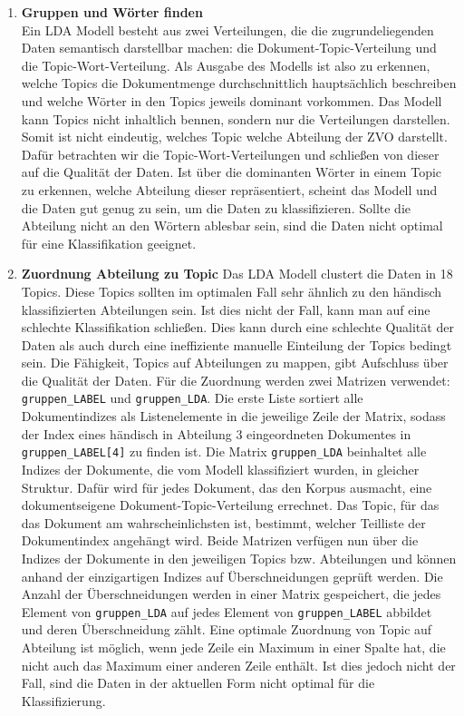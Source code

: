 \documentclass[german,version-2020-11]{uzl-thesis}
\begin{document}
\begin{enumerate}
\item \textbf{Gruppen und Wörter finden}\\
Ein LDA Modell besteht aus zwei Verteilungen, die die zugrundeliegenden Daten semantisch darstellbar machen: die Dokument-Topic-Verteilung und die Topic-Wort-Verteilung. Als Ausgabe des Modells ist also zu erkennen, welche Topics die Dokumentmenge durchschnittlich hauptsächlich beschreiben und welche Wörter in den Topics jeweils dominant vorkommen. Das Modell kann Topics nicht inhaltlich bennen, sondern nur die Verteilungen darstellen. Somit ist nicht eindeutig, welches Topic welche Abteilung der ZVO darstellt. Dafür betrachten wir die Topic-Wort-Verteilungen und schließen von dieser auf die Qualität der Daten. Ist über die dominanten Wörter in einem Topic zu erkennen, welche Abteilung dieser repräsentiert, scheint das Modell und die Daten gut genug zu sein, um die Daten zu klassifizieren. Sollte die Abteilung nicht an den Wörtern ablesbar sein, sind die Daten nicht optimal für eine Klassifikation geeignet. 

\item \textbf{Zuordnung Abteilung zu Topic}
Das LDA Modell clustert die Daten in 18 Topics. Diese Topics sollten im optimalen Fall sehr ähnlich zu den händisch klassifizierten Abteilungen sein. Ist dies nicht der Fall, kann man auf eine schlechte Klassifikation schließen. Dies kann durch eine schlechte Qualität der Daten als auch durch eine ineffiziente manuelle Einteilung der Topics bedingt sein. Die Fähigkeit, Topics auf Abteilungen zu mappen, gibt Aufschluss über die Qualität der Daten. Für die Zuordnung werden zwei Matrizen verwendet: \lstinline{gruppen_LABEL} und \lstinline{gruppen_LDA}. Die erste Liste sortiert alle Dokumentindizes als Listenelemente in die jeweilige Zeile der Matrix, sodass der Index eines händisch in Abteilung 3 eingeordneten Dokumentes in \lstinline{gruppen_LABEL[4]} zu finden ist. Die Matrix \lstinline{gruppen_LDA} beinhaltet alle Indizes der Dokumente, die vom Modell klassifiziert wurden, in gleicher Struktur. Dafür wird für jedes Dokument, das den Korpus ausmacht, eine dokumentseigene Dokument-Topic-Verteilung errechnet. Das Topic, für das das Dokument am wahrscheinlichsten ist, bestimmt, welcher Teilliste der Dokumentindex angehängt wird. Beide Matrizen verfügen nun über die Indizes der Dokumente in den jeweiligen Topics bzw. Abteilungen und können anhand der einzigartigen Indizes auf Überschneidungen geprüft werden. Die Anzahl der Überschneidungen werden in einer Matrix gespeichert, die jedes Element von \lstinline{gruppen_LDA} auf jedes Element von \lstinline{gruppen_LABEL} abbildet und deren Überschneidung zählt. Eine optimale Zuordnung von Topic auf Abteilung ist möglich, wenn jede Zeile ein Maximum in einer Spalte hat, die nicht auch das Maximum einer anderen Zeile enthält. Ist dies jedoch nicht der Fall, sind die Daten in der aktuellen Form nicht optimal für die Klassifizierung. 
\end{enumerate}
\end{document}
